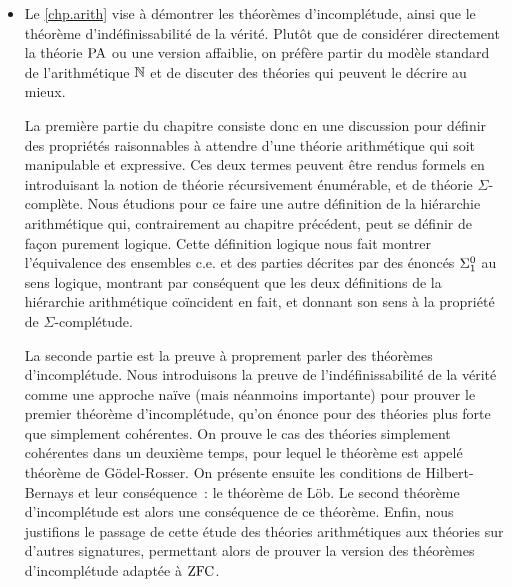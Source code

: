 \begin{itemize}
  La seconde partie est dédiée aux problèmes de décision. On décrit d'abord la
  notion de problème de décision, en se basant sur le problème de l'arrêt déjà
  introduit dans la partie précédente. On définit les problèmes calculables et
  calculatoirement énumérables, puis les réductions de problèmes many-one (et
  one-one) et la hiérarchie arithmétique. Enfin, on présente la réduction
  Turing, le saut Turing et l'arrêt itéré, nous permettant
  d'énoncer et démontrer le théorème de Post.

\item Le \cref{chp.arith} vise à démontrer les théorèmes d'incomplétude, ainsi
  que le théorème d'indéfinissabilité de la vérité. Plutôt que de considérer
  directement la théorie $\operatorname{PA}$ ou une version affaiblie, on préfère
  partir du modèle standard de l'arithmétique $\mathbb N$ et de discuter des théories
  qui peuvent le décrire au mieux.

  La première partie du chapitre consiste donc en une discussion pour définir
  des propriétés raisonnables à attendre d'une théorie arithmétique qui soit
  manipulable et expressive. Ces deux termes peuvent être rendus formels en
  introduisant la notion de théorie récursivement énumérable, et de théorie
  $\Sigma$-complète. Nous étudions pour ce faire une autre définition de la
  hiérarchie arithmétique qui, contrairement au chapitre précédent, peut se
  définir de façon purement logique. Cette définition logique nous fait montrer
  l'équivalence des ensembles c.e. et des parties décrites par des énoncés
  $\Sigma^0_{1}$ au sens logique, montrant par conséquent que les deux
  définitions de la hiérarchie arithmétique coïncident en fait, et donnant son
  sens à la propriété de $\Sigma$-complétude.

  La seconde partie est la preuve à proprement parler des théorèmes
  d'incomplétude. Nous introduisons la preuve de l'indéfinissabilité de la
  vérité comme une approche naïve (mais néanmoins importante) pour prouver le
  premier théorème d'incomplétude, qu'on énonce pour des théories plus forte que
  simplement cohérentes. On prouve le cas des théories simplement cohérentes
  dans un deuxième temps, pour lequel le théorème est appelé théorème de
  Gödel-Rosser. On présente ensuite les conditions de
  Hilbert-Bernays et leur conséquence~: le théorème de Löb.
  Le second théorème d'incomplétude est alors une conséquence de ce théorème.
  Enfin, nous justifions le passage de cette étude des théories arithmétiques
  aux théories sur d'autres signatures, permettant alors de prouver la version
  des théorèmes d'incomplétude adaptée à $\operatorname{ZFC}$.
\end{itemize}

